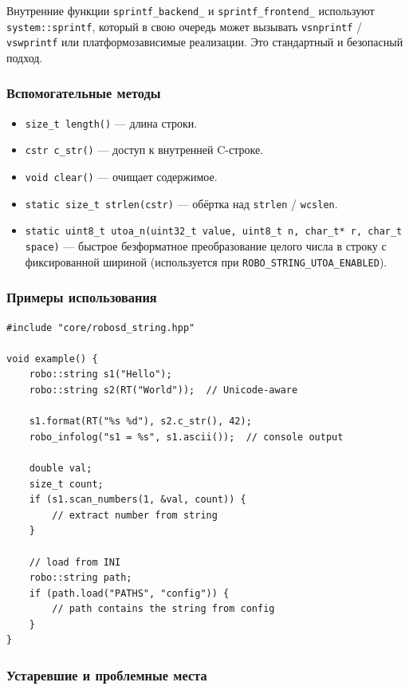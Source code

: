 \documentclass[a4paper,12pt]{article}
\begin{document}
Внутренние функции \texttt{sprintf\_backend\_} и \texttt{sprintf\_frontend\_} используют \texttt{system::sprintf}, который в свою очередь может вызывать \texttt{vsnprintf} / \texttt{vswprintf} или платформозависимые реализации. Это стандартный и безопасный подход.

\subsubsection{Вспомогательные методы}

\begin{itemize}
    \item \texttt{size\_t length()} — длина строки.
    \item \texttt{cstr c\_str()} — доступ к внутренней C-строке.
    \item \texttt{void clear()} — очищает содержимое.
    \item \texttt{static size\_t strlen(cstr)} — обёртка над \texttt{strlen} / \texttt{wcslen}.
    \item \texttt{static uint8\_t utoa\_n(uint32\_t value, uint8\_t n, char\_t* r, char\_t space)} — быстрое безформатное преобразование целого числа в строку с фиксированной шириной (используется при \texttt{ROBO\_STRING\_UTOA\_ENABLED}).
\end{itemize}

\subsubsection{Примеры использования}

\begin{lstlisting}[caption={Демонстрация возможностей string}]
#include "core/robosd_string.hpp"

void example() {
    robo::string s1("Hello");
    robo::string s2(RT("World"));  // Unicode-aware

    s1.format(RT("%s %d"), s2.c_str(), 42);
    robo_infolog("s1 = %s", s1.ascii());  // console output

    double val;
    size_t count;
    if (s1.scan_numbers(1, &val, count)) {
        // extract number from string
    }

    // load from INI
    robo::string path;
    if (path.load("PATHS", "config")) {
        // path contains the string from config
    }
}
\end{lstlisting}

\subsubsection{Устаревшие и проблемные места}
\end{document}
